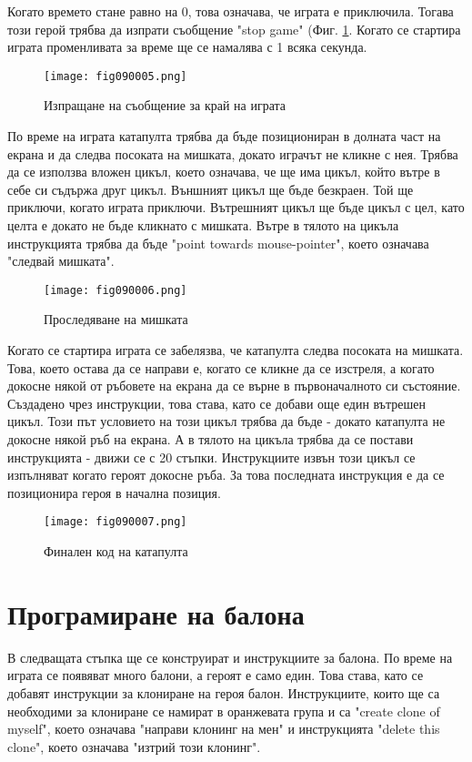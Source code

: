 Когато времето стане равно на 0, това означава, че играта е приключила. Тогава този герой трябва да изпрати съобщение "stop game" (Фиг. \ref{fig090005}. Когато се стартира играта променливата за време ще се намалява с 1 всяка секунда.

\begin{figure}[H]
  \centering
  \texttt{[image: fig090005.png]}
  \caption{Изпращане на съобщение за край на играта}
\label{fig090005}
\end{figure}

По време на играта катапулта трябва да бъде позициониран в долната част на екрана и да следва посоката на мишката, докато играчът не кликне с нея. Трябва да се използва вложен цикъл, което означава, че ще има цикъл, който вътре в себе си съдържа друг цикъл. Външният цикъл ще бъде безкраен. Той ще приключи, когато играта приключи. Вътрешният цикъл ще бъде цикъл с цел, като целта е докато не бъде кликнато с мишката. Вътре в тялото на цикъла инструкцията трябва да бъде "point towards mouse-pointer", което означава "следвай мишката".
 
\begin{figure}[H]
  \centering
  \texttt{[image: fig090006.png]}
  \caption{Проследяване на мишката}
\label{fig090006}
\end{figure}

Когато се стартира играта се забелязва, че катапулта следва посоката на мишката. Това, което остава да се направи е, когато се кликне да се изстреля, а когато докосне някой от ръбовете на екрана да се върне в първоначалното си състояние. Създадено чрез инструкции, това става, като се добави още един вътрешен цикъл. Този път условието на този цикъл трябва да бъде - докато катапулта не докосне някой ръб на екрана. А в тялото на цикъла трябва да се постави инструкцията - движи се с 20 стъпки. Инструкциите извън този цикъл се изпълняват когато героят докосне ръба. За това последната инструкция е да се позиционира героя в начална позиция.

\begin{figure}[H]
  \centering
  \texttt{[image: fig090007.png]}
  \caption{Финален код на катапулта}
\label{fig090007}
\end{figure}

\section{Програмиране на балона}
В следващата стъпка ще се конструират и инструкциите за балона. По време на играта се появяват много балони, а героят е само един. Това става, като се добавят инструкции за клониране на героя балон. Инструкциите, които ще са необходими за клониране се намират в оранжевата група и са "create clone of myself", което означава "направи клонинг на мен" и инструкцията "delete this clone", което означава "изтрий този клонинг".

